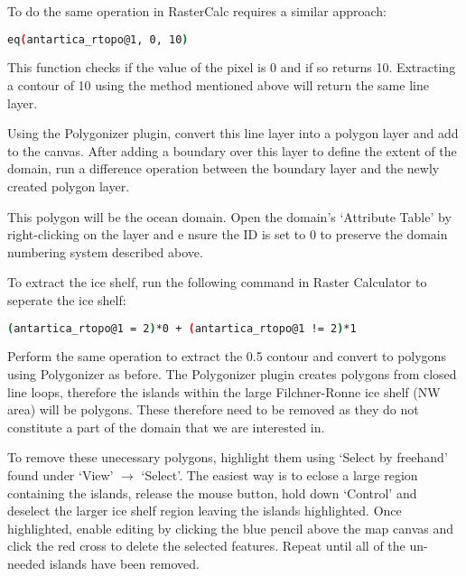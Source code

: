 To do the same operation in RasterCalc requires a similar approach:

\begin{example}
  \begin{lstlisting}[language=bash]
  eq(antartica_rtopo@1, 0, 10)
  \end{lstlisting}
\end{example}

This function checks if the value of the pixel is 0 and if so returns 10. Extracting a contour of 10 using the method mentioned above will return the same line layer.
 

Using the Polygonizer plugin, convert this line layer into a polygon layer and add to the canvas. After adding a boundary over this layer to define the extent of the domain, run a difference operation between the boundary layer and the newly created polygon layer.

This polygon will be the ocean domain. Open the domain's `Attribute Table' by right-clicking on the layer and e nsure the ID is set to 0 to preserve the domain numbering system described above. 

To extract the ice shelf, run the following command in Raster Calculator to seperate the ice shelf:

\begin{example}
  \begin{lstlisting}[language=bash]
  (antartica_rtopo@1 = 2)*0 + (antartica_rtopo@1 != 2)*1
  \end{lstlisting}
\end{example}

Perform the same operation to extract the 0.5 contour and convert to polygons using Polygonizer as before. The Polygonizer plugin creates polygons from closed line loops, therefore the islands within the large Filchner-Ronne ice shelf (NW area) will be polygons. These therefore need to be removed as they do not constitute a part of the domain that we are interested in. 

To remove these unecessary polygons, highlight them using `Select by freehand' found under `View' $\rightarrow$ `Select'. The easiest way is to eclose a large region containing the islands, release the mouse button, hold down `Control' and deselect the larger ice shelf region leaving the islands highlighted. Once highlighted, enable editing by clicking the blue pencil above the map canvas and click the red cross to delete the selected features. Repeat until all of the un-needed islands have been removed. 

